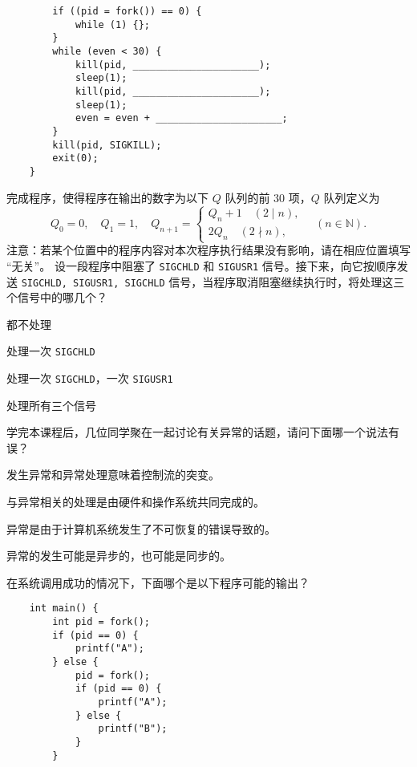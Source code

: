 \begin{problems}
\begin{verbatim}
        if ((pid = fork()) == 0) {
            while (1) {};
        }
        while (even < 30) {
            kill(pid, ______________________);
            sleep(1);
            kill(pid, ______________________);
            sleep(1);
            even = even + ______________________;
        }
        kill(pid, SIGKILL);
        exit(0);
    }
        \end{verbatim}
        完成程序，使得程序在输出的数字为以下 $Q$ 队列的前 30 项，$Q$ 队列定义为
        \[ Q_0=0, \quad Q_1=1, \quad Q_{n+1} = \begin{cases}
            Q_n+1 \quad (2 \mid n), \\
            2Q_n \quad (2 \nmid n),
        \end{cases} \quad (n \in \mathbb N). \]
        注意：若某个位置中的程序内容对本次程序执行结果没有影响，请在相应位置填写 “无关”。
         设一段程序中阻塞了 \verb|SIGCHLD| 和 \verb|SIGUSR1| 信号。接下来，向它按顺序发送 \verb|SIGCHLD, SIGUSR1, SIGCHLD| 信号，当程序取消阻塞继续执行时，将处理这三个信号中的哪几个？
        \begin{choices}
            \item 都不处理
            \item 处理一次 \verb|SIGCHLD|
            \item 处理一次 \verb|SIGCHLD|，一次 \verb|SIGUSR1|
            \item 处理所有三个信号
        \end{choices}
         学完本课程后，几位同学聚在一起讨论有关异常的话题，请问下面哪一个说法有误？
        \begin{choices}
            \item 发生异常和异常处理意味着控制流的突变。
            \item 与异常相关的处理是由硬件和操作系统共同完成的。
            \item 异常是由于计算机系统发生了不可恢复的错误导致的。
            \item 异常的发生可能是异步的，也可能是同步的。
        \end{choices}
         在系统调用成功的情况下，下面哪个是以下程序可能的输出？
        \begin{verbatim}
    int main() {
        int pid = fork();
        if (pid == 0) {
            printf("A");
        } else {
            pid = fork();
            if (pid == 0) {
                printf("A");
            } else {
                printf("B");
            }
        }

\end{verbatim}
\end{problems}
